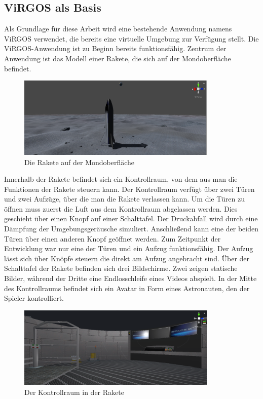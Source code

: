 \subsection{ViRGOS als Basis}
Als Grundlage für diese Arbeit wird eine bestehende Anwendung namens ViRGOS verwendet, die bereits eine virtuelle Umgebung zur Verfügung stellt. Die ViRGOS-Anwendung ist zu Beginn bereits funktionsfähig. Zentrum der Anwendung ist das Modell einer Rakete, die sich auf der Mondoberfläche befindet. \newline

\begin{figure}[H]
\centering
\includegraphics[width=0.85\textwidth]{VirgosRakete.PNG}
\caption{Die Rakete auf der Mondoberfläche}
\end{figure}

Innerhalb der Rakete befindet sich ein Kontrollraum, von dem aus man die Funktionen der Rakete steuern kann. Der Kontrollraum verfügt über zwei Türen und zwei Aufzüge, über die man die Rakete verlassen kann. Um die Türen zu öffnen muss zuerst die Luft aus dem Kontrollraum abgelassen werden. Dies geschieht über einen Knopf auf einer Schalttafel. Der Druckabfall wird durch eine Dämpfung der Umgebungsgeräusche simuliert. Anschließend kann eine der beiden Türen über einen anderen Knopf geöffnet werden. Zum Zeitpunkt der Entwicklung war nur eine der Türen und ein Aufzug funktionsfähig. Der Aufzug lässt sich über Knöpfe steuern die direkt am Aufzug angebracht sind. Über der Schalttafel der Rakete befinden sich drei Bildschirme. Zwei zeigen statische Bilder, während der Dritte eine Endlosschleife eines Videos abspielt. In der Mitte des Kontrollraums befindet sich ein Avatar in Form eines Astronauten, den der Spieler kontrolliert.\newline

\begin{figure}[H]
\centering
\includegraphics[width=0.85\textwidth]{VirgosKommandozentrale.PNG}
\caption{Der Kontrollraum in der Rakete}
\end{figure}

